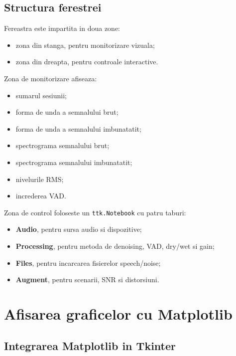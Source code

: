 \documentclass[12pt,a4paper]{article}
\begin{document}
\subsection{Structura ferestrei}

Fereastra este impartita in doua zone:

\begin{itemize}
    \item zona din stanga, pentru monitorizare vizuala;
    \item zona din dreapta, pentru controale interactive.
\end{itemize}

Zona de monitorizare afiseaza:

\begin{itemize}
    \item sumarul sesiunii;
    \item forma de unda a semnalului brut;
    \item forma de unda a semnalului imbunatatit;
    \item spectrograma semnalului brut;
    \item spectrograma semnalului imbunatatit;
    \item nivelurile RMS;
    \item increderea VAD.
\end{itemize}

Zona de control foloseste un \texttt{ttk.Notebook} cu patru taburi:

\begin{itemize}
    \item \textbf{Audio}, pentru sursa audio si dispozitive;
    \item \textbf{Processing}, pentru metoda de denoising, VAD, dry/wet si gain;
    \item \textbf{Files}, pentru incarcarea fisierelor speech/noise;
    \item \textbf{Augment}, pentru scenarii, SNR si distorsiuni.
\end{itemize}

\section{Afisarea graficelor cu Matplotlib}

\subsection{Integrarea Matplotlib in Tkinter}
\end{document}

